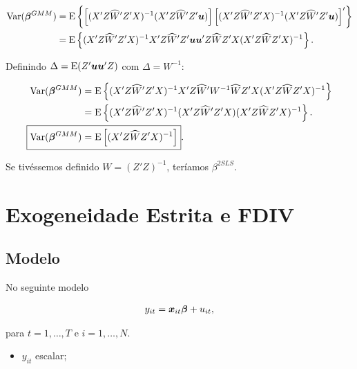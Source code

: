 \documentclass[11pt, oneside, a4paper, article]{article}
\numberwithin{equation}{section}
\begin{document}
\begin{description}
\begin{description}
\vspace{-1 em}
\begin{align*}
\text{Var}( \boldsymbol{\beta}^{GMM} ) &=
\text{E} \left\{ 
\left[ ( X' Z \widehat{W}' Z' X )^{-1} ( X' Z \widehat{W}' Z' \boldsymbol{u} ) \right]
\left[ ( X' Z \widehat{W}' Z' X )^{-1} ( X' Z \widehat{W}' Z' \boldsymbol{u} ) \right]'
\right\}
\\ &=
\text{E} \left\{ 
( X' Z \widehat{W}' Z' X )^{-1}
X' Z \widehat{W}' Z' \boldsymbol{u} \boldsymbol{u}' Z \widehat{W} Z' X 
( X' Z \widehat{W} Z' X )^{-1}
\right\}.
\end{align*}

\noindent
Definindo $\Delta = \text{E}(Z' \boldsymbol{u}\boldsymbol{u}' Z)$ com $\Delta = W^{-1}$:

\vspace{-1 em}
\begin{align*}
\Var( \mbs{\beta}^{GMM} ) &=
\E \left\{ 
( X' Z \widehat{W}' Z' X )^{-1}
X' Z \widehat{W}' W^{-1} \widehat{W} Z' X 
( X' Z \widehat{W} Z' X )^{-1}
\right\}
\\ &=
\E \left\{ 
( X' Z \widehat{W}' Z' X )^{-1}
( X' Z \widehat{W}' Z' X )
( X' Z \widehat{W} Z' X )^{-1}
\right\}.
\\
\Aboxed{
\Var( \mbs{\beta}^{GMM} ) &=
\E \left[
( X' Z \widehat{W} Z' X )^{-1}
\right] }.
\end{align*}

\noindent
Se tivéssemos definido $W = (Z'Z)^{-1}$, teríamos $\beta^{2SLS}$.


\clearpage
\section{Exogeneidade Estrita e FDIV}


\subsection*{Modelo}

No seguinte modelo

\vspace{-1 em}
\begin{align*} 
	y_{it} = \boldsymbol{x}_{it} \boldsymbol{\beta} + u_{it},
\end{align*}

\noindent
para
$t = 1, \dots, T$ e $i = 1, \dots, N$.

\begin{itemize}\itemsep0pt
\item
$y_{it}$ escalar;


\end{itemize}
\end{description}
\end{description}
\end{document}
